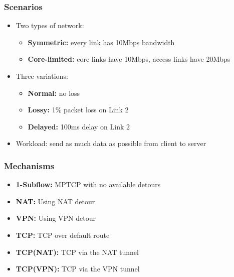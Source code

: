 \documentclass{beamer}
\begin{document}
\begin{frame}
  \frametitle{Scenarios}

  \begin{itemize}
  \item Two types of network:
    \begin{itemize}
    \item \textbf{Symmetric:} every link has 10Mbps bandwidth
    \item \textbf{Core-limited:} core links have 10Mbps, access links have 20Mbps
    \end{itemize}
  \item Three variations:
    \begin{itemize}
    \item \textbf{Normal:} no loss
    \item \textbf{Lossy:} 1\% packet loss on Link 2 
    \item \textbf{Delayed:} 100ms delay on Link 2  
    \end{itemize}
  \item Workload: send as much data as possible from client to server
  \end{itemize}
\end{frame}

\begin{frame}
  \frametitle{Mechanisms}

  \begin{itemize}
  \item \textbf{1-Subflow:} MPTCP with no available detours
  \item \textbf{NAT:} Using NAT detour
  \item \textbf{VPN:} Using VPN detour
  \item \textbf{TCP:} TCP over default route
  \item \textbf{TCP(NAT):} TCP via the NAT tunnel
  \item \textbf{TCP(VPN):} TCP via the VPN tunnel
  \end{itemize}
\end{frame}
\end{document}
